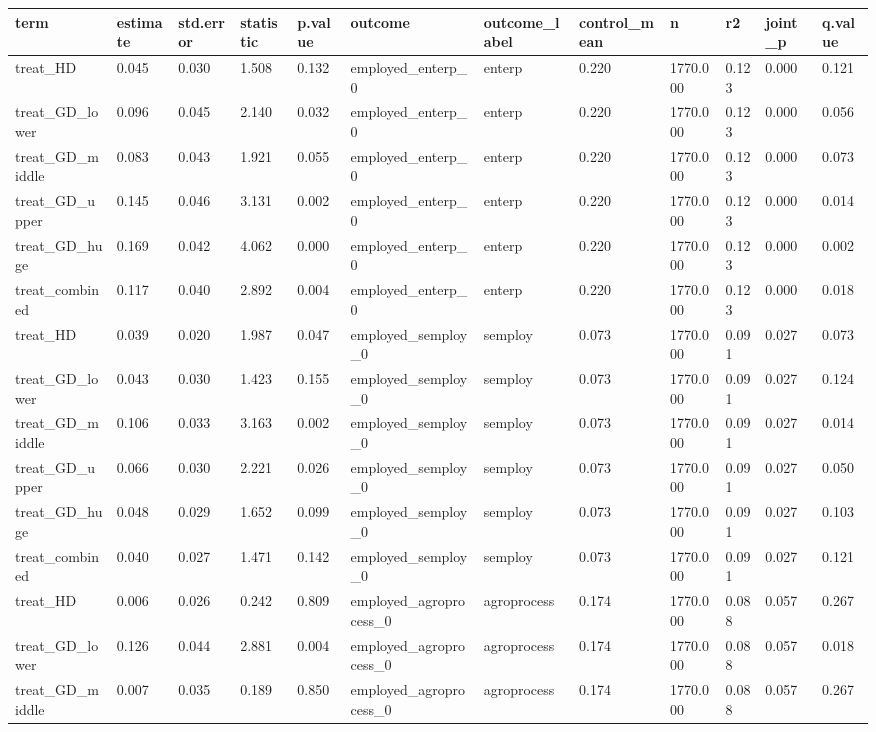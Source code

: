 \begin{tabular}{llllllllllll}
\toprule
term & estimate & std.error & statistic & p.value & outcome & outcome\_label & control\_mean & n & r2 & joint\_p & q.value
 \\
\midrule
treat\_HD & 0.045 & 0.030 & 1.508 & 0.132 & employed\_enterp\_0 & enterp & 0.220 & 1770.000 & 0.123 & 0.000 & 0.121 \\
treat\_GD\_lower & 0.096 & 0.045 & 2.140 & 0.032 & employed\_enterp\_0 & enterp & 0.220 & 1770.000 & 0.123 & 0.000 & 0.056 \\
treat\_GD\_middle & 0.083 & 0.043 & 1.921 & 0.055 & employed\_enterp\_0 & enterp & 0.220 & 1770.000 & 0.123 & 0.000 & 0.073 \\
treat\_GD\_upper & 0.145 & 0.046 & 3.131 & 0.002 & employed\_enterp\_0 & enterp & 0.220 & 1770.000 & 0.123 & 0.000 & 0.014 \\
treat\_GD\_huge & 0.169 & 0.042 & 4.062 & 0.000 & employed\_enterp\_0 & enterp & 0.220 & 1770.000 & 0.123 & 0.000 & 0.002 \\
treat\_combined & 0.117 & 0.040 & 2.892 & 0.004 & employed\_enterp\_0 & enterp & 0.220 & 1770.000 & 0.123 & 0.000 & 0.018 \\
treat\_HD & 0.039 & 0.020 & 1.987 & 0.047 & employed\_semploy\_0 & semploy & 0.073 & 1770.000 & 0.091 & 0.027 & 0.073 \\
treat\_GD\_lower & 0.043 & 0.030 & 1.423 & 0.155 & employed\_semploy\_0 & semploy & 0.073 & 1770.000 & 0.091 & 0.027 & 0.124 \\
treat\_GD\_middle & 0.106 & 0.033 & 3.163 & 0.002 & employed\_semploy\_0 & semploy & 0.073 & 1770.000 & 0.091 & 0.027 & 0.014 \\
treat\_GD\_upper & 0.066 & 0.030 & 2.221 & 0.026 & employed\_semploy\_0 & semploy & 0.073 & 1770.000 & 0.091 & 0.027 & 0.050 \\
treat\_GD\_huge & 0.048 & 0.029 & 1.652 & 0.099 & employed\_semploy\_0 & semploy & 0.073 & 1770.000 & 0.091 & 0.027 & 0.103 \\
treat\_combined & 0.040 & 0.027 & 1.471 & 0.142 & employed\_semploy\_0 & semploy & 0.073 & 1770.000 & 0.091 & 0.027 & 0.121 \\
treat\_HD & 0.006 & 0.026 & 0.242 & 0.809 & employed\_agroprocess\_0 & agroprocess & 0.174 & 1770.000 & 0.088 & 0.057 & 0.267 \\
treat\_GD\_lower & 0.126 & 0.044 & 2.881 & 0.004 & employed\_agroprocess\_0 & agroprocess & 0.174 & 1770.000 & 0.088 & 0.057 & 0.018 \\
treat\_GD\_middle & 0.007 & 0.035 & 0.189 & 0.850 & employed\_agroprocess\_0 & agroprocess & 0.174 & 1770.000 & 0.088 & 0.057 & 0.267 \\

\end{tabular}
